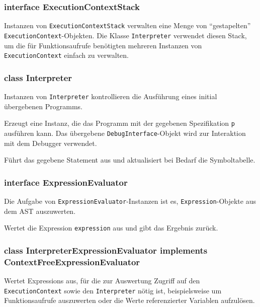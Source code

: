 \subsubsection{interface ExecutionContextStack}

Instanzen von \texttt{ExecutionContextStack} verwalten eine Menge von ``gestapelten'' \texttt{ExecutionContext}-Objekten. Die Klasse \texttt{Interpreter} verwendet diesen Stack, um die für Funktionsaufrufe benötigten mehreren Instanzen von \texttt{ExecutionContext} einfach zu verwalten.

\subsubsection{class Interpreter}

Instanzen von \texttt{Interpreter} kontrollieren die Ausführung eines initial übergebenen Programms.

\begin{description}
    Erzeugt eine Instanz, die das Programm mit der gegebenen Spezifikation \texttt{p} ausführen kann. Das übergebene \texttt{DebugInterface}-Objekt wird zur Interaktion mit dem Debugger verwendet.

    Führt das gegebene Statement aus und aktualisiert bei Bedarf die Symboltabelle.
\end{description}


\subsubsection{interface ExpressionEvaluator}
Die Aufgabe von \texttt{ExpressionEvaluator}-Instanzen ist es, \texttt{Expression}-Objekte aus dem AST auszuwerten.
\begin{description}
    Wertet die Expression \texttt{expression} aus und gibt das Ergebnis zurück.
\end{description}

\subsubsection{class InterpreterExpressionEvaluator implements ContextFreeExpressionEvaluator}
Wertet Expressions aus, für die zur Auswertung Zugriff auf den \texttt{ExecutionContext} sowie den \texttt{Interpreter} nötig ist, beispielsweise um Funktionsaufrufe auszuwerten oder die Werte referenzierter Variablen aufzulösen.

